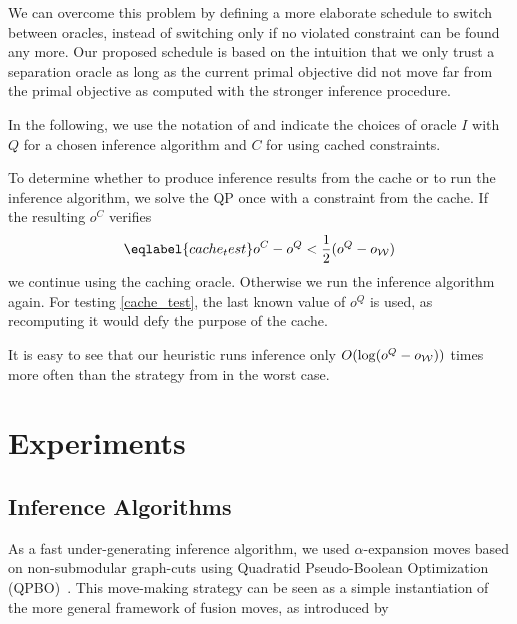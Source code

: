 We can overcome this problem by defining a more elaborate schedule to switch
between oracles, instead of switching only if no violated constraint can be
found any more. Our proposed schedule is based on the intuition that we only
trust a separation oracle as long as the current primal objective did not move
far from the primal objective as computed with the stronger inference
procedure.


In the following, we use the notation of  and indicate
the choices of oracle $I$ with $Q$ for a chosen inference algorithm and $C$ for
using cached constraints.

To determine whether to produce inference results from the cache or to run the inference algorithm,
we solve the QP once with a constraint from the cache. If the resulting $o^C$ verifies
\begin{equation}\eqlabel{cache_test}
    o^C - o^Q < \frac{1}{2} (o^Q - o_{\W})
\end{equation}
we continue using the caching oracle. Otherwise we run the inference algorithm again.
For testing \eqref{cache_test}, the last known value of $o^Q$ is used, as recomputing it would defy
the purpose of the cache.

It is easy to see that our heuristic runs inference only $O(\log(o^Q -
o_{\mathcal{W}}))$ times more often than the strategy from \citet{joachims2009cutting} in the
worst case.


\section{Experiments}

\subsection{Inference Algorithms}

As a fast under-generating inference algorithm, we used $\alpha$-expansion
moves based on non-submodular graph-cuts using Quadratid Pseudo-Boolean
Optimization (QPBO)~\citep{rother2007optimizing}.  This move-making strategy
can be seen as a simple instantiation of the more general framework of fusion
moves, as introduced by \citet{lempitsky2010fusion}

